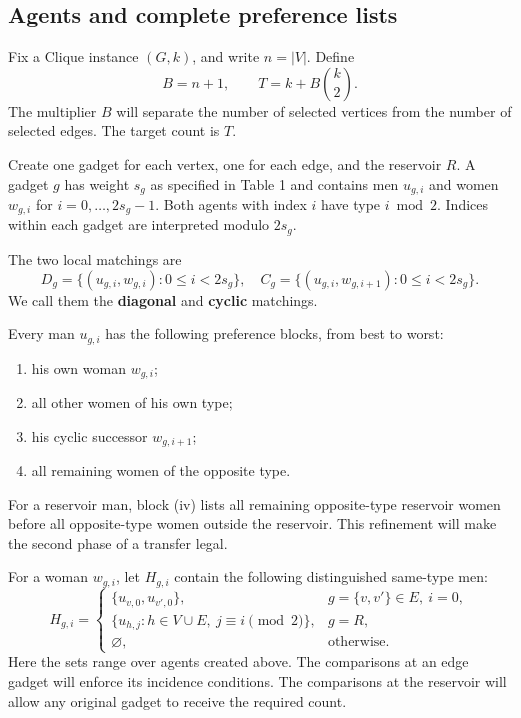 \documentclass[11pt,letterpaper]{article}
\theoremstyle{definition}
\begin{document}
\subsection{Agents and complete preference lists}

Fix a Clique instance $(G,k)$, and write $n=|V|$. Define
\begin{equation}\tag{4}
B=n+1,\qquad T=k+B\binom{k}{2}.
\end{equation}
The multiplier $B$ will separate the number of selected vertices from the number of selected edges. The target count is $T$.

Create one gadget for each vertex, one for each edge, and the reservoir $R$. A gadget $g$ has weight $s_g$ as specified in Table 1 and contains men $u_{g,i}$ and women $w_{g,i}$ for $i=0,\ldots,2s_g-1$. Both agents with index $i$ have type $i\bmod 2$. Indices within each gadget are interpreted modulo $2s_g$.

The two local matchings are
\begin{equation}\tag{5}
D_g=\{(u_{g,i},w_{g,i}):0\le i<2s_g\},\quad C_g=\{(u_{g,i},w_{g,i+1}):0\le i<2s_g\}.
\end{equation}
We call them the \textbf{diagonal} and \textbf{cyclic} matchings.

Every man $u_{g,i}$ has the following preference blocks, from best to worst:
\begin{enumerate}[label=(\roman*),leftmargin=2.7em,itemsep=.45ex]
\item his own woman $w_{g,i}$;
\item all other women of his own type;
\item his cyclic successor $w_{g,i+1}$;
\item all remaining women of the opposite type.
\end{enumerate}
For a reservoir man, block (iv) lists all remaining opposite-type reservoir women before all opposite-type women outside the reservoir. This refinement will make the second phase of a transfer legal.

For a woman $w_{g,i}$, let $H_{g,i}$ contain the following distinguished same-type men:
\begin{equation}\tag{6}
H_{g,i}=\begin{cases}
\{u_{v,0},u_{v',0}\},&g=\{v,v'\}\in E,\ i=0,\\
\{u_{h,j}:h\in V\cup E,\ j\equiv i\pmod{2}\},&g=R,\\
\varnothing,&\text{otherwise.}
\end{cases}
\end{equation}
Here the sets range over agents created above. The comparisons at an edge gadget will enforce its incidence conditions. The comparisons at the reservoir will allow any original gadget to receive the required count.
\end{document}
